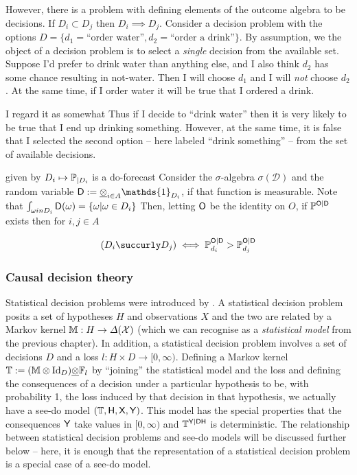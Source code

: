 However, there is a problem with defining elements of the outcome algebra to be decisions. If $D_i\subset D_j$ then $D_i\implies D_j$. Consider a decision problem with the options $D=\{d_1=\text{``order water''},d_2=\text{``order a drink''}\}$. By assumption, we the object of a decision problem is to select a \emph{single} decision from the available set. Suppose I'd prefer to drink water than anything else, and I also think $d_2$ has some chance resulting in not-water. Then I will choose $d_1$ and I will \emph{not} choose $d_2$. At the same time, if I order water it will be true that I ordered a drink. 

 I regard it as somewhat  Thus if I decide to ``drink water'' then it is very likely to be true that I end up drinking something. However, at the same time, it is false that I selected the second option -- here labeled ``drink something'' -- from the set of available decisions. 

given by $D_i\mapsto \mathbb{P}_{|D_i}$ is a do-forecast  Consider the $\sigma$-algebra $\sigma(\mathscr{D})$ and the random variable $\RV{D}:=\utimes_{i\in A} \mathds{1}_{D_i}$, if that function is measurable. Note that $\int_{\omega in D_i} \mathsf{D}(\omega)=\{\omega|\omega\in D_i\}$ Then, letting $\mathsf{O}$ be the identity on $O$, if $\mathbb{P}^{\mathsf{O}|\mathsf{D}}$ exists then for $i,j\in A$

\begin{align}
    (D_i\succurly D_j) \iff \prob{P}^{\RV{O}|\RV{D}}_{d_i}>\prob{P}^{\RV{O}|\RV{D}}_{d_j}
\end{align}


\subsubsection{Causal decision theory}



Statistical decision problems were introduced by \citet{wald_statistical_1950}. A statistical decision problem posits a set of hypotheses $H$ and observations $X$ and the two are related by a Markov kernel $\mathbb{M}:H\to \Delta(\mathcal{X})$ (which we can recognise as a \emph{statistical model} from the previous chapter). In addition, a statistical decision problem involves a set of decisions $D$ and a loss $l:H\times D\to [0,\infty)$. Defining a Markov kernel $\mathbb{T}:=(\mathbb{M}\otimes\mathrm{Id}_D)\underline{\otimes} \mathbb{F}_l$ by ``joining'' the statistical model and the loss and defining the consequences of a decision under a particular hypothesis to be, with probability 1, the loss induced by that decision in that hypothesis, we actually have a see-do model $(\mathbb{T}, \mathsf{H}, \mathsf{X}, \mathsf{Y})$. This model has the special properties that the consequences $\mathsf{Y}$ take values in $[0,\infty)$ and $\mathbb{T}^{\mathsf{Y}|\mathsf{D}\mathsf{H}}$ is deterministic. The relationship between statistical decision problems and see-do models will be discussed further below -- here, it is enough that the representation of a statistical decision problem is a special case of a see-do model.



